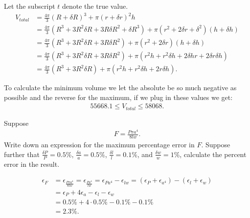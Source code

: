 \documentclass[10pt]{article}
\begin{document}
\begin{solution}[2]  \label{sol:2}
Let the subscript \(t\) denote the true value.
\begin{align*}
V _{total}  &  = \frac{4 \pi}{3} (R + \delta R)^{3} + \pi (r+ \delta r) ^2 h \\
& = \frac{4 \pi}{3} (R^{3} + 3 R^2 \delta R + 3 R \delta R ^2 + \delta R^{3})
+ \pi (r ^2 + 2 \delta r+ \delta ^2) (h + \delta h) \\
& = \frac{4 \pi}{3} (R^{3} + 3 R^2 \delta R + 3 R \delta R ^2)
+ \pi (r ^2 + 2 \delta r) (h + \delta h) \\
& = \frac{4 \pi}{3} (R^{3} + 3 R^2 \delta R + 3 R \delta R ^2)
+ \pi (r ^2 h + r ^2 \delta h + 2 \delta h r + 2 \delta r \delta h) \\
& = \frac{4 \pi}{3} (R^{3} + 3 R^2 \delta R)
+ \pi (r ^2 h + r ^2 \delta h + 2r \delta h )
.
\end{align*}

To calculate the minimum volume we let the absolute be so much negative
as possible and the reverse for the maximum, if we plug in these values
we get:
\begin{align*}
55668.1 \leq V _{total} \leq 58068
.
\end{align*}


\end{solution}
\begin{exercise}[3]  \label{exe:3}
Suppose
\begin{align*}
F = \frac{P \pi a^{4} }{8lw} 
.
\end{align*}
Write down an expression for the maximum percentage error in \(F\). Suppose
further that \(\frac{\delta P}{P} = 0.5\%\), \(\frac{\delta a}{a} = 0.5 \%\), \(\frac{\delta l}{l} = 0.1\%\), and \(\frac{\delta w}{w} = 1\%\), calculate the
percent error in the result.
\end{exercise}
\begin{solution}[3]  \label{sol:3}
\begin{align*}
\epsilon _{F}  &  = \epsilon _{\frac{P \pi a^{4}}{8 l w}} = \epsilon _{\frac{P a^{4}}{ l w} }
= \epsilon _{P a^{4}} - \epsilon _{l w} = (\epsilon _{P} + \epsilon _{a^{4}}) - (\epsilon _{l} + \epsilon _{w}) \\
& = \epsilon _{P} + 4 \epsilon _{a} - \epsilon _{l} - \epsilon _{w} \\
& = 0.5 \% + 4 \cdot 0.5\% - 0.1 \% - 0.1 \% \\
& = 2.3 \%
.
\end{align*}

\end{solution}
\end{document}

